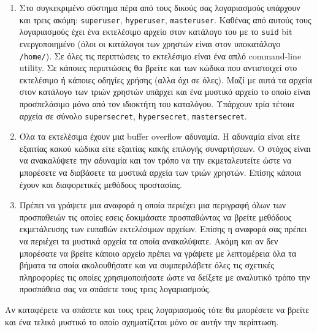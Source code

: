 \documentclass[11pt,a4paper]{article}
\begin{document}
\begin{enumerate}
\item Στο συγκεκριμένο σύστημα πέρα από τους δικούς σας λογαριασμούς
υπάρχουν και τρεις ακόμη:
{\tt superuser}, {\tt hyperuser}, {\tt masteruser}. Καθένας
από αυτούς τους λογαριασμούς έχει ένα εκτελέσιμο αρχείο
στον κατάλογο του με το 
 {\tt suid} bit ενεργοποιημένο (όλοι οι κατάλογοι των χρηστών
 είναι στον υποκατάλογο  {\tt /home/}). Σε όλες τις περιπτώσεις
 το εκτελέσιμο είναι ένα απλό
 command-line utility. Σε κάποιες περιπτώσεις
 θα βρείτε και των κώδικα που αντιστοιχεί στο εκτελέσιμο ή κάποιες
 οδηγίες χρήσης  (αλλα όχι σε όλες). 
 Μαζί με αυτά τα αρχεία  στον κατάλογο των τριών χρηστών
 υπάρχει και ένα μυστικό αρχείο το οποίο είναι προσπελάσιμο
 μόνο από τον ιδιοκτήτη του καταλόγου.  Υπάρχουν
 τρία τέτοια  αρχεία σε σύνολο 
 {\tt supersecret}, {\tt hypersecret}, {\tt mastersecret}.

\item 
Όλα τα εκτελέσιμα έχουν μια buffer overflow αδυναμία.
Η  αδυναμία  είναι είτε εξαιτίας κακού κώδικα είτε εξαιτίας
κακής επιλογής συναρτήσεων. 
Ο στόχος είναι να ανακαλύψετε την αδυναμία  και τον τρόπο
να την εκμεταλευτείτε ώστε να μπορέσετε να διαβάσετε 
τα μυστικά αρχεία των τριών χρηστών. Επίσης κάποια
έχουν και διαφορετικές μεθόδους προστασίας. 

\item Πρέπει να γράψετε μια αναφορά η οποία 
περιέχει μια περιγραφή όλων των προσπαθειών τις
οποίες εσεις δοκιμάσατε προσπαθώντας να βρείτε  μεθόδους
εκμετάλευσης των ευπαθών εκτελέσιμων αρχείων. 
Επίσης η αναφορά σας πρέπει να περιέχει τα μυστικά αρχεία
τα οποία ανακαλύψατε.  Ακόμη και αν δεν μπορέσατε
να βρείτε κάποιο αρχείο πρέπει να γράψετε με λεπτομέρεια
όλα τα βήματα τα οποία ακολουθήσατε και να συμπεριλάβετε
όλες τις σχετικές πληροφορίες τις οποίες χρησιμοποιήσατε ώστε
να δείξετε με αναλυτικό τρόπο την προσπάθεια σας να σπάσετε
τους τρεις λογαριασμούς. 
\end{enumerate}

Αν καταφέρετε να  σπάσετε και τους τρεις λογαριασμούς τότε
θα μπορέσετε να βρείτε και ένα τελικό μυστικό το οποίο σχηματίζεται
μόνο σε αυτήν την περίπτωση. 
\end{document}
